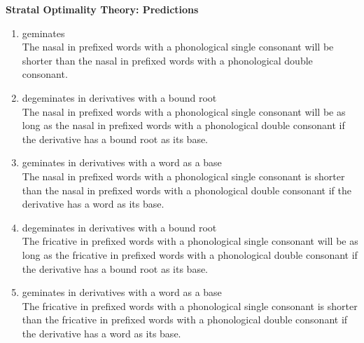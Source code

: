\textbf{Stratal Optimality Theory: Predictions}

\begin{enumerate}
	
	\item {} geminates \\
	The nasal in prefixed words with a phonological single consonant will be shorter than the nasal in  prefixed words with a phonological double consonant. 
		
	\item{} degeminates in derivatives with a bound root\\
	 The nasal in prefixed words with a phonological single consonant will be as long as the nasal in  prefixed words with a phonological double consonant if  the derivative has a bound root as its base.

	\item {} geminates in derivatives with a word as a base \\
	The nasal in prefixed words with a phonological single consonant is shorter than the nasal in prefixed words with a phonological double consonant if  the derivative has a word as its base.


\clearpage
	
	\item {} degeminates in derivatives with a bound root\\
	The fricative in prefixed words with a phonological single consonant will be as long as the fricative in prefixed words with a phonological double consonant if  the derivative has a bound root as its base.

	\item {} geminates in derivatives with a word as a base \\
	The fricative in prefixed words with a phonological single consonant is shorter than the fricative in prefixed words with a phonological double consonant if  the derivative has a word as its base.


\end{enumerate}
